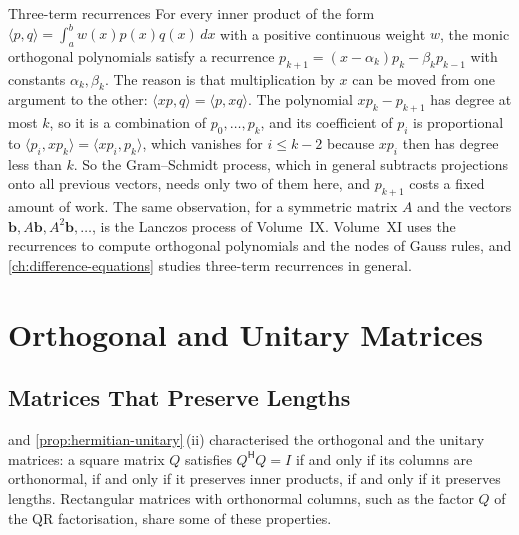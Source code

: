 \begin{note}{Three-term recurrences}
For every inner product of the form $\langle p,q\rangle=\int_a^bw(x)p(x)q(x)\,dx$ with a positive continuous weight $w$, the monic orthogonal polynomials satisfy a recurrence $p_{k+1}=(x-\alpha_k)p_k-\beta_kp_{k-1}$ with constants $\alpha_k,\beta_k$. The reason is that multiplication by $x$ can be moved from one argument to the other: $\langle xp,q\rangle=\langle p,xq\rangle$. The polynomial $xp_k-p_{k+1}$ has degree at most $k$, so it is a combination of $p_0,\ldots,p_k$, and its coefficient of $p_i$ is proportional to $\langle p_i,xp_k\rangle=\langle xp_i,p_k\rangle$, which vanishes for $i\le k-2$ because $xp_i$ then has degree less than $k$. So the Gram--Schmidt process, which in general subtracts projections onto all previous vectors, needs only two of them here, and $p_{k+1}$ costs a fixed amount of work. The same observation, for a symmetric matrix $A$ and the vectors $\mathbf b,A\mathbf b,A^2\mathbf b,\ldots$, is the Lanczos process of Volume~IX. Volume~XI uses the recurrences to compute orthogonal polynomials and the nodes of Gauss rules, and \cref{ch:difference-equations} studies three-term recurrences in general.
\end{note}

\section{Orthogonal and Unitary Matrices}
\label{sec:unitary-matrices}

\subsection{Matrices That Preserve Lengths}

 and \cref{prop:hermitian-unitary}\,(ii) characterised the orthogonal and the unitary matrices: a square matrix $Q$ satisfies $Q^{\mathsf H}Q=I$ if and only if its columns are orthonormal, if and only if it preserves inner products, if and only if it preserves lengths. Rectangular matrices with orthonormal columns, such as the factor $Q$ of the QR factorisation, share some of these properties.

